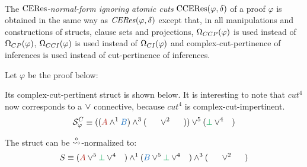 \begin{definition}
\label{definition:CEResNormalFormIgnoringAtomicCuts} \hspace*{\fill} \\
The \emph{$\CERes$-normal-form ignoring atomic cuts} $\CEResNFComplex{\varphi}{\delta}$ of a proof $\varphi$ is obtained in the same way as $\CEResNF{\varphi}{\delta}$ except that, in all manipulations and constructions of structs, clause sets and projections, $\occCutPertComplex{\varphi}$ is used instead of $\occCutPert{\varphi}$, $\occCutImpertComplex{\varphi}$ is used instead of $\occCutImpert{\varphi}$ and complex-cut-pertinence of inferences is used instead of cut-pertinence of inferences.
\end{definition}

\begin{example}
\label{example:CEResNormalFormIgnoringAtomicCuts}

Let $\varphi$ be the proof below:

\begin{prooftree}
		 
	 
						 
					 
					 
									 
								 
\end{prooftree}

Its complex-cut-pertinent struct is shown below. It is interesting to note that $cut^4$ now corresponds to a $\structtimes$ connective, because $cut^4$ is complex-cut-impertinent.
$$
\struct{\varphi}^C 
\equiv 
((\hA{A} \structplus^1 \hB{B}) \structplus^3 (\hC{\structdual{B}} \structtimes^2 \hD{\structdual{A}}))
\structtimes^5
(\hE{\structtimesEmpty} \structtimes^4 \hF{\structtimesEmpty})
$$

The struct can be $\normalizePlusTimesS$-normalized to:
$$
S
\equiv
	(\hA{A}\structtimes^5 \hE{\structtimesEmpty} \structtimes^4 \hF{\structtimesEmpty}) 
\structplus^1 
	(\hB{B}\structtimes^5 \hE{\structtimesEmpty} \structtimes^4 \hF{\structtimesEmpty}) 
\structplus^3 
	(\hC{\structdual{B}} \structtimes^2 \hD{\structdual{A}})
$$


\end{example}
